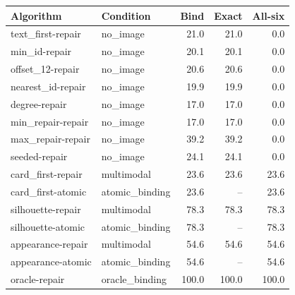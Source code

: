 \begin{tabular}{@{}llrrr@{}}
\toprule
Algorithm & Condition & Bind & Exact & All-six\\
\midrule
text\_first-repair & no\_image & 21.0 & 21.0 & 0.0\\
min\_id-repair & no\_image & 20.1 & 20.1 & 0.0\\
offset\_12-repair & no\_image & 20.6 & 20.6 & 0.0\\
nearest\_id-repair & no\_image & 19.9 & 19.9 & 0.0\\
degree-repair & no\_image & 17.0 & 17.0 & 0.0\\
min\_repair-repair & no\_image & 17.0 & 17.0 & 0.0\\
max\_repair-repair & no\_image & 39.2 & 39.2 & 0.0\\
seeded-repair & no\_image & 24.1 & 24.1 & 0.0\\
card\_first-repair & multimodal & 23.6 & 23.6 & 23.6\\
card\_first-atomic & atomic\_binding & 23.6 & -- & 23.6\\
silhouette-repair & multimodal & 78.3 & 78.3 & 78.3\\
silhouette-atomic & atomic\_binding & 78.3 & -- & 78.3\\
appearance-repair & multimodal & 54.6 & 54.6 & 54.6\\
appearance-atomic & atomic\_binding & 54.6 & -- & 54.6\\
oracle-repair & oracle\_binding & 100.0 & 100.0 & 100.0\\
\bottomrule
\end{tabular}
